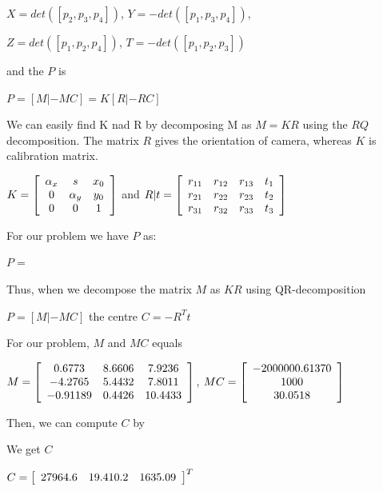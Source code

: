 \documentclass[]{article}
\begin{document}
\centerline {
	$X=det([p_2, p_3, p_4])$, $Y=-det([p_1, p_3, p_4])$, 
}

\centerline {
	$Z=det([p_1, p_2, p_4])$, $T=-det([p_1, p_2, p_3])$
}

and the $P$ is 

\centerline {
	$P=[M | -MC] = K[R | -RC ]$
}

We can easily find K nad R by decomposing M as $M = KR$ using the $RQ$ decomposition. The matrix $R$ gives the orientation of camera, whereas $K$ is calibration matrix. 

\centerline {
		$K = \left[ {\begin{array}{*{20}c}
		\alpha _x & s & x_0\\
		0 & \alpha _y & y_0 \\ 
		0 & 0 & 1   
		\end{array} } \right]$ and $R|t = \left[ {\begin{array}{*{20}c}
		r_{11} & r_{12} & r_{13} & t_1 \\
		r_{21} & r_{22} & r_{23} & t_2 \\ 
		r_{31} & r_{32} & r_{33} & t_3    
		\end{array} } \right]$
}

For our problem we have $P$ as:

\centerline {
	$P = $
}

Thus, when we decompose the matrix $M$ as $KR$ using QR-decomposition 

\centerline {
	$P = [M| -MC]$ the centre $C = -R^Tt$
}

For our problem, $M$ and $MC$ equals 

\centerline {
	$M = \left[ {\begin{array}{*{20}c}
		0.6773 & 8.6606 & 7.9236 \\
		-4.2765 & 5.4432 & 7.8011 \\ 
		-0.91189 & 0.4426 & 10.4433     
		\end{array} } \right]$, $MC = \left[ {\begin{array}{*{20}c}
		-2000000.61370 \\
		1000 \\ 
		30.0518     
		\end{array} } \right] $
}

Then, we can compute $C$ by



We get  $C$ 

\centerline {
	$C = \left[ {\begin{array}{*{20}c}
		27964.6 &  19.410.2 & 1635.09   
		\end{array} } \right]^T$
}
\end{document}

